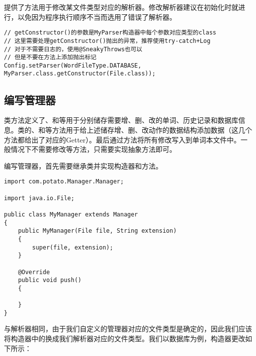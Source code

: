提供了方法用于修改某文件类型对应的解析器。修改解析器建议在初始化时就进行，以免因为程序执行顺序不当而选用了错误了解析器。

\begin{lstlisting}[style=Java, caption={修改解析器},label={lst:修改解析器}]
// getConstructor()的参数是MyParser构造器中每个参数对应类型的class
// 这里需要处理getConstructor()抛出的异常，推荐使用try-catch+Log
// 对于不需要日志的，使用@SneakyThrows也可以
// 但是不要在方法上添加抛出标记
Config.setParser(WordFileType.DATABASE, MyParser.class.getConstructor(File.class));
\end{lstlisting}

\subsection[管理器]{编写管理器}\label{subsec:管理器}

类方法定义了、和等用于分别储存需要增、删、改的单词、历史记录和数据库信息。类的、和等方法用于给上述储存增、删、改动作的数据结构添加数据（这几个方法都给出了对应的Getter）。最后通过方法将所有修改写入到单词本文件中。一般情况下不需要修改等方法，只需要实现抽象方法即可。

编写管理器，首先需要继承类并实现构造器和方法。

\begin{lstlisting}[style=Java, caption={初始布局},label={lst:Manager初始布局}]
import com.potato.Manager.Manager;

import java.io.File;

public class MyManager extends Manager
{
    public MyManager(File file, String extension)
    {
        super(file, extension);
    }

    @Override
    public void push()
    {

    }
}
\end{lstlisting}

与解析器相同，由于我们自定义的管理器对应的文件类型是确定的，因此我们应该将构造器中的换成我们解析器对应的文件类型。我们以数据库为例，构造器更改如下所示：

